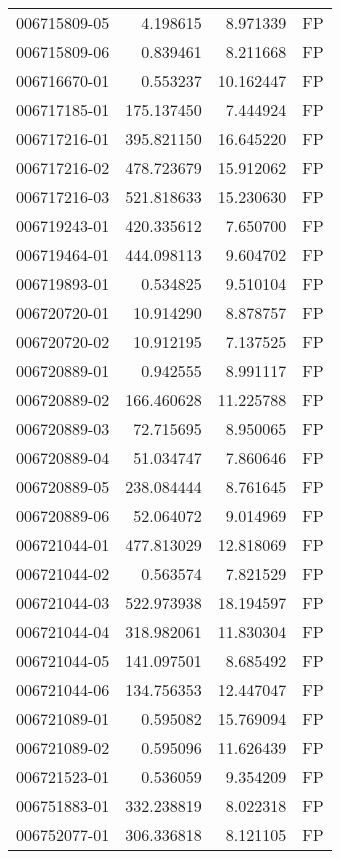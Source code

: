 \begin{tabular}{lrrl}
006715809-05 &    4.198615 &     8.971339 &   FP \\
006715809-06 &    0.839461 &     8.211668 &   FP \\
006716670-01 &    0.553237 &    10.162447 &   FP \\
006717185-01 &  175.137450 &     7.444924 &   FP \\
006717216-01 &  395.821150 &    16.645220 &   FP \\
006717216-02 &  478.723679 &    15.912062 &   FP \\
006717216-03 &  521.818633 &    15.230630 &   FP \\
006719243-01 &  420.335612 &     7.650700 &   FP \\
006719464-01 &  444.098113 &     9.604702 &   FP \\
006719893-01 &    0.534825 &     9.510104 &   FP \\
006720720-01 &   10.914290 &     8.878757 &   FP \\
006720720-02 &   10.912195 &     7.137525 &   FP \\
006720889-01 &    0.942555 &     8.991117 &   FP \\
006720889-02 &  166.460628 &    11.225788 &   FP \\
006720889-03 &   72.715695 &     8.950065 &   FP \\
006720889-04 &   51.034747 &     7.860646 &   FP \\
006720889-05 &  238.084444 &     8.761645 &   FP \\
006720889-06 &   52.064072 &     9.014969 &   FP \\
006721044-01 &  477.813029 &    12.818069 &   FP \\
006721044-02 &    0.563574 &     7.821529 &   FP \\
006721044-03 &  522.973938 &    18.194597 &   FP \\
006721044-04 &  318.982061 &    11.830304 &   FP \\
006721044-05 &  141.097501 &     8.685492 &   FP \\
006721044-06 &  134.756353 &    12.447047 &   FP \\
006721089-01 &    0.595082 &    15.769094 &   FP \\
006721089-02 &    0.595096 &    11.626439 &   FP \\
006721523-01 &    0.536059 &     9.354209 &   FP \\
006751883-01 &  332.238819 &     8.022318 &   FP \\
006752077-01 &  306.336818 &     8.121105 &   FP \\

\end{tabular}
